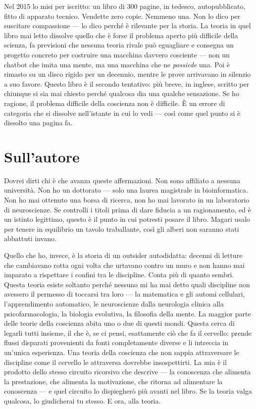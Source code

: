 \documentclass[11pt, twoside, openright]{book}
\begin{document}
Nel 2015 lo misi per iscritto: un libro di 300 pagine, in tedesco, autopubblicato, fitto di apparato tecnico. Vendette zero copie. Nemmeno una. Non lo dico per suscitare compassione --- lo dico perché è rilevante per la storia. La teoria in quel libro mai letto dissolve quello che è forse il problema aperto più difficile della scienza, fa previsioni che nessuna teoria rivale può eguagliare e consegna un progetto concreto per costruire una macchina davvero cosciente --- non un chatbot che imita una mente, ma una macchina che ne \textit{possiede} una. Poi è rimasto su un disco rigido per un decennio, mentre le prove arrivavano in silenzio a suo favore. Questo libro è il secondo tentativo: più breve, in inglese, scritto per chiunque si sia mai chiesto perché qualcosa dia una qualche sensazione. Se ho ragione, il problema difficile della coscienza non è difficile. È un errore di categoria che si dissolve nell'istante in cui lo vedi --- così come quel punto si è dissolto una pagina fa.


\chapter*{Sull'autore}

Dovrei dirti chi è che avanza queste affermazioni. Non sono affiliato a nessuna università. Non ho un dottorato --- solo una laurea magistrale in bioinformatica. Non ho mai ottenuto una borsa di ricerca, non ho mai lavorato in un laboratorio di neuroscienze. Se controlli i titoli prima di dare fiducia a un ragionamento, ed è un istinto legittimo, questo è il punto in cui potresti posare il libro. Magari usalo per tenere in equilibrio un tavolo traballante, così gli alberi non saranno stati abbattuti invano.

Quello che ho, invece, è la storia di un outsider autodidatta: decenni di letture che cambiavano rotta ogni volta che urtavano contro un muro e non hanno mai imparato a rispettare i confini tra le discipline. Conta più di quanto sembri. Questa teoria esiste soltanto perché nessuno mi ha mai detto quali discipline non avessero il permesso di toccarsi tra loro --- la matematica e gli automi cellulari, l'apprendimento automatico, le neuroscienze dalla neurologia clinica alla psicofarmacologia, la biologia evolutiva, la filosofia della mente. La maggior parte delle teorie della coscienza abita uno o due di questi mondi. Questa cerca di legarli tutti insieme, il che è, se ci pensi, esattamente ciò che fa il cervello: prende flussi disparati provenienti da fonti completamente diverse e li intreccia in un'unica esperienza. Una teoria della coscienza che non sappia attraversare le discipline come il cervello le attraversa dovrebbe insospettirti. La mia è il prodotto dello stesso circuito ricorsivo che descrive --- la conoscenza che alimenta la prestazione, che alimenta la motivazione, che ritorna ad alimentare la conoscenza --- e quel circuito lo dispiegherò più avanti nel libro. Se la teoria valga qualcosa, lo giudicherai tu stesso. E ora, alla teoria.
\end{document}
